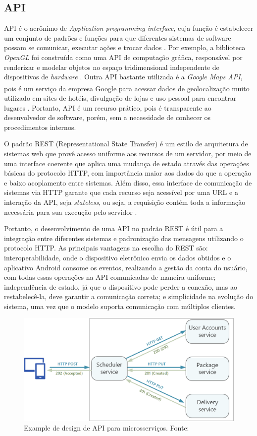\subsection{API}

API é o acrônimo de \textit{Application programming interface}, cuja função é estabelecer um conjunto de padrões e funções
para que diferentes sistemas de software possam se comunicar, executar ações e trocar dados \cite{api-definition}. Por exemplo, a biblioteca
\textit{OpenGL} foi construída como uma API de computação gráfica, responsável por renderizar e modelar objetos no espaço tridimensional independente
de dispositivos de \textit{hardware} \cite{opengl-example}. Outra API bastante utilizada é a \textit{Google Maps API}, pois é um serviço da empresa Google\textsuperscript{\textregistered} 
para acessar dados de geolocalização muito utilizado em sites de hotéis, divulgação de lojas e uso pessoal para encontrar lugares \cite{google-maps-example}. Portanto, API é um recurso 
prático, pois é transparente ao desenvolvedor de software, porém, sem a necessidade de conhecer os procedimentos internos.

O padrão REST (Representational State Transfer) é um estilo de arquitetura de sistemas web 
que provê acesso uniforme aos recursos de um servidor, por meio de uma interface coerente que aplica uma mudança de
estado através das operações básicas do protocolo HTTP, com importância maior aos dados do que a operação e baixo acoplamento entre sistemas. 
Além disso, essa interface de comunicação de sistemas via HTTP garante que cada recurso seja acessível por
uma URL e a interação da API, seja \textit{stateless}, ou seja, a requisição contém toda a informação necessária
para sua execução pelo servidor \cite[pp. 384--386]{sistemas-distribuidos-coulouris2013}. 

Portanto, o desenvolvimento de uma API no padrão REST é útil para a integração entre diferentes sistemas e  padronização das mensagens 
utilizando o protocolo HTTP. As principais vantagens na escolha do REST são: interoperabilidade, onde o 
dispositivo eletrônico envia os dados obtidos e o aplicativo Android consome os eventos, realizando a 
gestão da conta do usuário, com todas essas operações na API comunicadas de maneira uniforme; independência 
de estado, já que o dispositivo pode perder a conexão, mas ao restabelecê-la, deve garantir a comunicação correta; e simplicidade 
na evolução do sistema, uma vez que o modelo suporta comunicação com múltiplos clientes.

\begin{figure}[ht]
    \centering
    \includegraphics[width=.45\textwidth]{img/api-design.png}
    \caption{Example de design de API para microsserviços. Fonte:\cite{example-design-api}}\label{figAPIDesign}
\end{figure}

